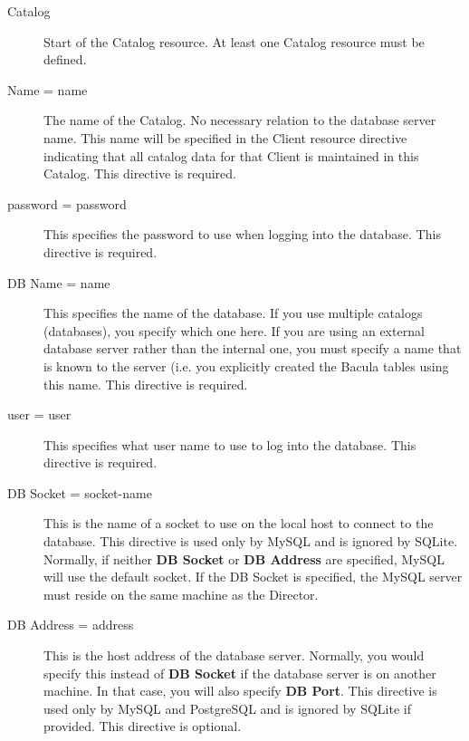 \begin{description}

\item [Catalog]
   Start of the Catalog resource.  At least one Catalog resource must be
defined.


\item [Name = \lt{}name\gt{}]
   The name of the Catalog.  No necessary relation to the database server
   name.  This name will be specified in the Client resource directive
   indicating that all catalog data for that Client is maintained in this
   Catalog.  This directive is required.

\item [password = \lt{}password\gt{}]
   This specifies the password to use when logging into the database.  This
   directive is required.

\item [DB Name = \lt{}name\gt{}]
   This specifies the name of the database.  If you use multiple catalogs
   (databases), you specify which one here.  If you are using an external
   database server rather than the internal one, you must specify a name
   that is known to the server (i.e.  you explicitly created the Bacula
   tables using this name.  This directive is required.

\item [user = \lt{}user\gt{}]
   This specifies what user name to use to log into the database.  This
   directive is required.

\item [DB Socket = \lt{}socket-name\gt{}]
   This is the name of  a socket to use on the local host to connect to the
   database. This directive is used only by MySQL and is ignored by  SQLite.
   Normally, if neither {\bf DB Socket} or {\bf DB Address}  are specified, MySQL
   will use the default socket. If the DB Socket is specified, the
   MySQL server must reside on the same machine as the Director.

\item [DB Address = \lt{}address\gt{}]
   This is the host address  of the database server. Normally, you would specify
   this instead  of {\bf DB Socket} if the database server is on another machine.
   In that case, you will also specify {\bf DB Port}. This directive  is used
   only by MySQL and PostgreSQL and is ignored by SQLite if provided.  
   This directive is optional.  


\end{description}
